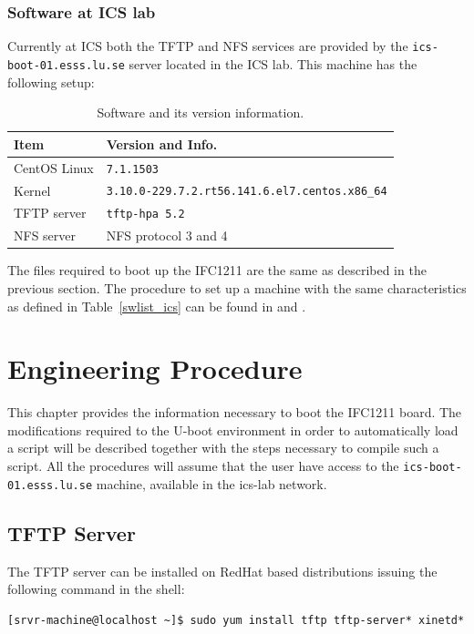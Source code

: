 \documentclass[11pt
  , a4paper
  , article
  , oneside
  , showtrims
]{memoir}
\begin{document}
\subsection{Software at ICS lab}
Currently at ICS both the TFTP and NFS services are provided by the \texttt{ics-boot-01.esss.lu.se} server located in the ICS lab. This machine has the following setup:
\begin{table}[!htb]
	\centering
	\begin{tabular}{l|l}
		\toprule\rowcolor{gray!15}
		Item                      & Version and Info.                                               \\\midrule
		CentOS Linux              & \texttt{7.1.1503}                                               \\\midrule
		Kernel                    & \texttt{3.10.0-229.7.2.rt56.141.6.el7.centos.x86\_64}           \\\midrule
		TFTP server               & \texttt{tftp-hpa 5.2}                                           \\\midrule
		NFS server                & NFS protocol 3 and 4                                            \\\bottomrule
	\end{tabular}
	\caption[]{Software and its version information.}
	\label{table:swlist_ics}
\end{table}
The files required to boot up the IFC1211 are the same as described in the previous section.
The procedure to set up a machine with the same characteristics as defined in Table~\ref{swlist_ics} can be found in \cite{SULI} and \cite{SETUP_LAB_INFRASTRUCTURE}.
\clearpage


\chapter{Engineering Procedure}

This chapter provides the information necessary to boot the IFC1211 board. The modifications required to the U-boot environment in order to automatically load a script will be described together with the steps necessary to compile such a script.
All the procedures will assume that the user have access to the \texttt{ics-boot-01.esss.lu.se} machine, available in the ics-lab network.


\iffalse
\section{TFTP Server}
The TFTP server can be installed on RedHat based distributions issuing the following command in the shell:
\begin{lstlisting}[style=termstyle]
[srvr-machine@localhost ~]$ sudo yum install tftp tftp-server* xinetd*
\end{lstlisting}
\end{document}
